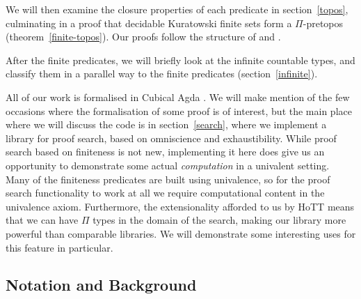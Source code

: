 We will then examine the closure properties of each predicate in
section~\ref{topos}, culminating in a proof that decidable Kuratowski finite
sets form a \(\Pi\)-pretopos (theorem~\ref{finite-topos}).
Our proofs follow the structure of \cite[Chapters 9, 10]{hottbook} and
\cite{rijkeSetsHomotopyType2015}.

After the finite predicates, we will briefly look at the infinite countable
types, and classify them in a parallel way to the finite predicates
(section~\ref{infinite}).

All of our work is formalised in Cubical Agda
\cite{vezzosiCubicalAgdaDependently2019}.
We will make mention of the few occasions where the formalisation of some proof
is of interest, but the main place where we will discuss the code is in
section~\ref{search}, where we implement a library for proof search, based on
omniscience and exhaustibility.
While proof search based on finiteness is not new, implementing it here does
give us an opportunity to demonstrate some actual \emph{computation} in a
univalent setting.
Many of the finiteness predicates are built using univalence, so for the proof
search functionality to work at all we require computational content in the
univalence axiom.
Furthermore, the extensionality afforded to us by HoTT means that we can have
\(\Pi\) types in the domain of the search, making our library more powerful than
comparable libraries.
We will demonstrate some interesting uses for this feature in particular.
\subsection{Notation and Background}
